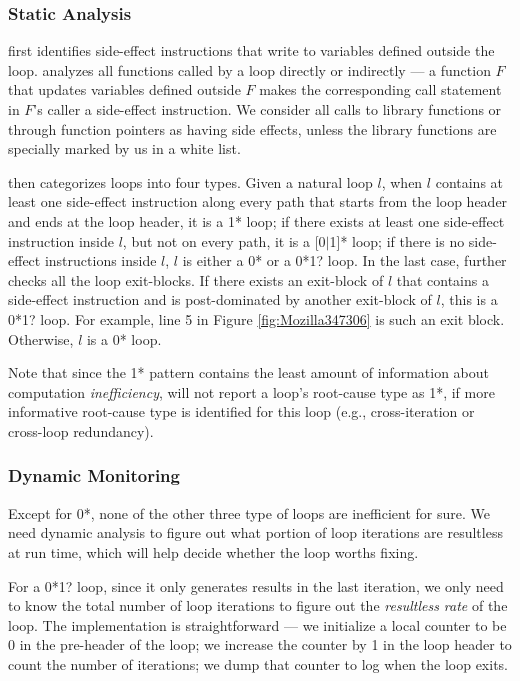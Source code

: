 \subsubsection{Static Analysis}
\label{sec:s_workless}

\Tool first identifies side-effect instructions that write to
variables defined outside the loop. 
\Tool analyzes all functions called
by a loop directly or indirectly --- a function $F$ that updates variables
defined outside $F$ makes the corresponding call statement in $F$'s
caller a side-effect instruction.
We consider all calls to library functions or through function pointers 
as having side effects, 
unless the library functions are specially marked by us in a white list.

\Tool then categorizes loops into four types.
Given a natural loop $l$, when $l$
contains at least one side-effect instruction along every path that
starts from the loop header and ends at the loop header, it is a 1* loop;
if there exists at least one side-effect instruction inside $l$, but not on
every path,
it is a [0$|$1]* loop; if there is no side-effect instructions inside $l$,
$l$ is either a 0* or a 0*1? loop.
In the last case, \Tool further checks all the loop exit-blocks. If there 
exists an exit-block of $l$ that contains a side-effect instruction and is  
post-dominated by another exit-block of $l$, this is a 0*1? loop.
For example, line 5 in Figure \ref{fig:Mozilla347306} is such an exit block.
Otherwise, $l$ is a 0* loop.

Note that since the 1* pattern contains the least amount of information
about computation \textit{inefficiency}, \Tool will not report a loop's
root-cause type as 1*, if more informative root-cause type is identified 
for this loop (e.g., cross-iteration or cross-loop redundancy).

\subsubsection{Dynamic Monitoring}
\label{sec:d_workless}

Except for 0*, none of the other three type of loops are inefficient for sure.
We need dynamic analysis to figure out what portion of loop iterations are
resultless at run time, which will help decide whether the loop worths fixing.

For a 0*1? loop, since it only generates results in the last iteration, we 
only need to know the total number of loop iterations 
to figure out the 
\textit{resultless rate} of the loop. The implementation is straightforward
--- we initialize a local counter to be 0 in the pre-header of the loop; we 
increase the counter by 1 in the loop header to count the number of 
iterations; we dump that counter to log when the loop exits.

